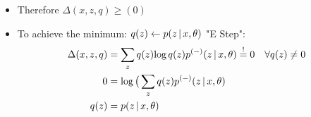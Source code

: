\begin{frame} [t]
\begin{itemize}
{\begin{align*}
              p \conditional 
                 {z} {x,\theta} 
            \big)
        \\ & \geq 
            \varlog ( 1 )
        \\ & \geq 
            (0)
        \end{align*}  
        }
    \item Therefore 
        $ \Delta (x,z,q) \geq (0)
        $
    \item To achieve the minimum:
          $ q(z) \leftarrow 
            p ( z \,\vert\, x,\theta )
          $ "E Step":
        { \footnotesize
       \begin{align*}
         \Delta (x,z,q) 
        & = 
         \sum _{z}  q(z) 
         \textnormal{log}\, q(z) p ^{(-)} 
                    ( z \,\vert\, x,\theta )
        \overset {!} {=} 0 
         \quad \forall q (z) \neq 0
        \\ 
        0 & =
         \textnormal{log}\, \big(
          \sum _{z} 
           q(z) p ^{(-)} 
                ( z \,\vert\, x,\theta )
        \\ 
         q(z) & = p ( z \,\vert\, x, \theta )
        \end{align*}
        } 
\end{itemize}   
\end{frame}


